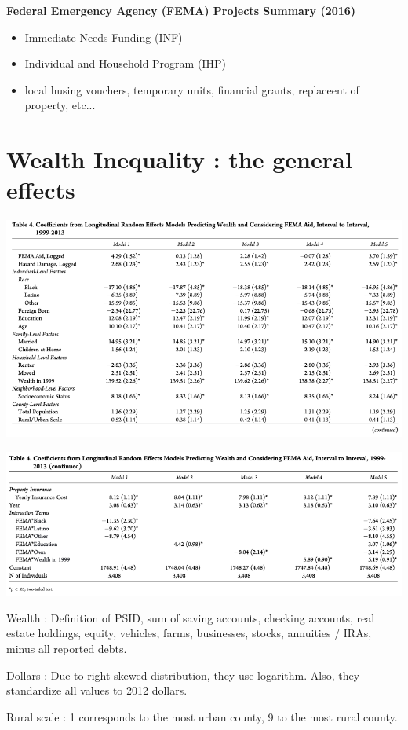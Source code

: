 \documentclass{beamer}
\begin{document}
\begin{frame}{\subsecname}
    \textbf{Federal Emergency Agency (FEMA) Projects Summary (2016)}
    \begin{itemize}
        \item Immediate Needs Funding (INF)
        \item Individual and Household Program (IHP)
        \item local husing vouchers, temporary units, financial grants, replaceent of property, etc...
    \end{itemize}
\end{frame}

\section{Wealth Inequality : the general effects}

    \begin{frame}{\secname}
        \includegraphics[totalheight=7cm,width=1\textwidth]{pictures/Table_4_1.png}
    \end{frame}

    \begin{frame}{\secname}
        \includegraphics[width=1\textwidth]{pictures/Table_4_2.png}
    \end{frame}

    \begin{frame}{\secname}
        Wealth : Definition of PSID, sum of saving accounts, checking accounts, real estate holdings, equity, vehicles,
        farms, businesses, stocks, annuities / IRAs, minus all reported debts.
        
        Dollars : Due to right-skewed distribution, they use logarithm. Also, they standardize all values to 2012 dollars. 

        Rural scale : 1 corresponds to the most urban county, 9 to the most rural county. 
    \end{frame}
\end{document}
